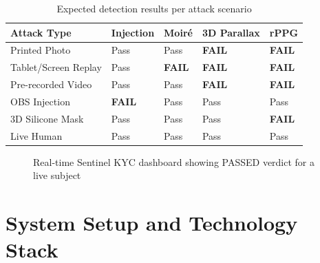\documentclass[12pt,a4paper]{report}
\begin{document}
\begin{table}[H]
    \centering
    \begin{tabular}{@{}p{4cm}llll@{}}
        \toprule
        \textbf{Attack Type} & \textbf{Injection} & \textbf{Moir\'{e}} & \textbf{3D Parallax} & \textbf{rPPG} \\ \midrule
        Printed Photo        & Pass     & Pass   & \textbf{FAIL}       & \textbf{FAIL} \\
        Tablet/Screen Replay & Pass     & \textbf{FAIL} & \textbf{FAIL}  & \textbf{FAIL} \\
        Pre-recorded Video   & Pass     & Pass   & \textbf{FAIL}       & \textbf{FAIL} \\
        OBS Injection        & \textbf{FAIL} & Pass & Pass             & Pass          \\
        3D Silicone Mask     & Pass     & Pass   & Pass               & \textbf{FAIL} \\
        Live Human           & Pass     & Pass   & Pass               & Pass          \\ \bottomrule
    \end{tabular}
    \caption{Expected detection results per attack scenario}
    \label{tab:threats}
\end{table}

\begin{figure}[H]
    \centering
    \caption{Real-time Sentinel KYC dashboard showing PASSED verdict for a live subject}
    \label{fig:verdict}
\end{figure}

\chapter{System Setup and Technology Stack}
\end{document}
